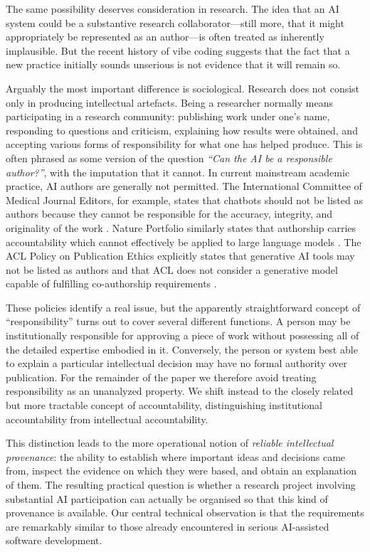 \documentclass[12pt]{article}
\begin{document}
The same possibility deserves consideration in research. The idea that an AI system could be a substantive research collaborator---still more, that it might appropriately be represented as an author---is often treated as inherently implausible. But the recent history of vibe coding suggests that the fact that a new practice initially sounds unserious is not evidence that it will remain so.

Arguably the most important difference is sociological. Research does not consist only in producing intellectual artefacts. Being a researcher normally means participating in a research community: publishing work under one's name, responding to questions and criticism, explaining how results were obtained, and accepting various forms of responsibility for what one has helped produce.
This is often phrased as some version of the question \emph{``Can the AI be a responsible author?''}, with the imputation that it cannot. In current mainstream academic practice, AI authors are generally not permitted. The International Committee of Medical Journal Editors, for example, states that chatbots should not be listed as authors because they cannot be responsible for the accuracy, integrity, and originality of the work \citep{icmje2026ai}. Nature Portfolio similarly states that authorship carries accountability which cannot effectively be applied to large language models \citep{nature2026ai}. The ACL Policy on Publication Ethics explicitly states that generative AI tools may not be listed as authors and that ACL does not consider a generative model capable of fulfilling co-authorship requirements \citep{acl2026policy}.

These policies identify a real issue, but the apparently straightforward concept of ``responsibility'' turns out to cover several different functions. A person may be institutionally responsible for approving a piece of work without possessing all of the detailed expertise embodied in it. Conversely, the person or system best able to explain a particular intellectual decision may have no formal authority over publication.
For the remainder of the paper we therefore avoid treating responsibility as an unanalyzed property. We shift instead to the closely related but more tractable concept of accountability, distinguishing institutional accountability from intellectual accountability.

This distinction leads to the more operational notion of \emph{reliable intellectual provenance}: the ability to establish where important ideas and decisions came from, inspect the evidence on which they were based, and obtain an explanation of them. The resulting practical question is whether a research project involving substantial AI participation can actually be organised so that this kind of provenance is available. Our central technical observation is that the requirements are remarkably similar to those already encountered in serious AI-assisted software development.
\end{document}
